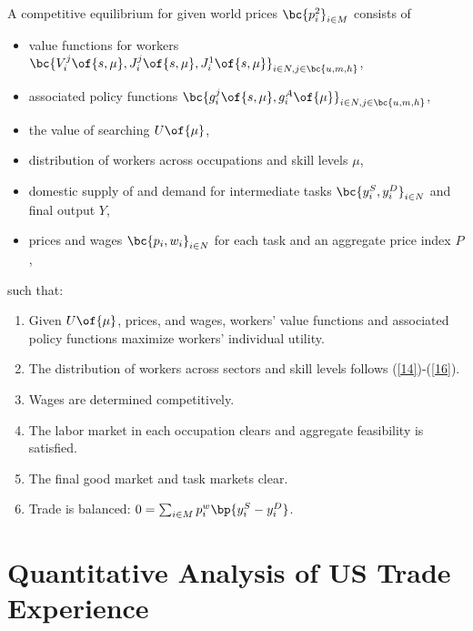 \documentclass[12pt]{article}
\theoremstyle{definition}
\begin{document}
A competitive equilibrium for given world prices $\bc{p_i^2}_{i \in M}$ consists of 
\begin{itemize}[topsep=0pt, leftmargin=20pt, itemsep=0pt]
	\setlength{\parskip}{10pt} 
	\item value functions for workers $\bc{V_i^j\of{s, \mu}, J_i^j\of{s, \mu}, J_i^1\of{s, \mu}}_{i \in N, j \in \bc{u, m, h}}$,
	\item associated policy functions $\bc{g_i^j\of{s, \mu}, g_i^A\of{\mu}}_{i \in N, j \in \bc{u, m, h}}$,
	\item the value of searching $U\of{\mu}$, 
	\item distribution of workers across occupations and skill levels $\mu$,
	\item domestic supply of and demand for intermediate tasks $\bc{y_i^S, y_i^D}_{i \in N}$ and final output $Y$,
	\item prices and wages $\bc{p_i, w_i}_{i \in N}$ for each task and an aggregate price index $P$,
\end{itemize}
such that:
\begin{enumerate}[topsep=0pt, leftmargin=20pt, itemsep=0pt, label=(\arabic*)]
	\setlength{\parskip}{10pt} 
	\item Given $U\of{\mu}$, prices, and wages, workers' value functions and associated policy functions maximize workers' individual utility. 
	\item The distribution of workers across sectors and skill levels follows (\ref{14})-(\ref{16}).
	\item Wages are determined competitively.
	\item The labor market in each occupation clears and aggregate feasibility is satisfied.
	\item The final good market and task markets clear.
	\item Trade is balanced: $0 = \sum_{i \in M} p_i^w \bp{y_i^S - y_i^D}$. 
\end{enumerate}


\section{Quantitative Analysis of US Trade Experience}
\end{document}
